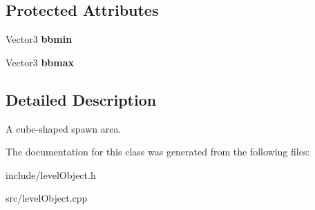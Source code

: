 \subsection*{\-Protected \-Attributes}
\begin{DoxyCompactItemize}
\item 
\hypertarget{classObjectSpawnAreaCube_afdbcd68acb2bb50bdc60068cc1af7e07}{
\-Vector3 {\bfseries bbmin}}
\label{df/d33/classObjectSpawnAreaCube_afdbcd68acb2bb50bdc60068cc1af7e07}

\item 
\hypertarget{classObjectSpawnAreaCube_a5c8d7144a4e666bb8c05b1e38ade9041}{
\-Vector3 {\bfseries bbmax}}
\label{df/d33/classObjectSpawnAreaCube_a5c8d7144a4e666bb8c05b1e38ade9041}

\end{DoxyCompactItemize}


\subsection{\-Detailed \-Description}
\-A cube-\/shaped spawn area. 

\-The documentation for this class was generated from the following files\-:\begin{DoxyCompactItemize}
\item 
include/level\-Object.\-h\item 
src/level\-Object.\-cpp\end{DoxyCompactItemize}
